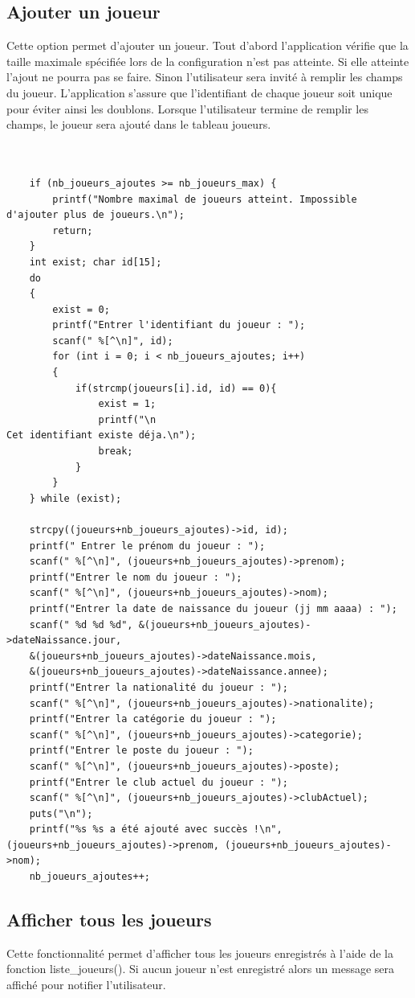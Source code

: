 \documentclass[12pt,a4paper]{report}
\begin{document}
\subsection{Ajouter un joueur}
Cette option permet d'ajouter un joueur. 
Tout d'abord l'application vérifie que la taille maximale spécifiée lors de la configuration n'est pas atteinte. Si elle atteinte l'ajout ne pourra pas se faire. Sinon l'utilisateur sera invité à remplir les champs du joueur. L'application s'assure que l'identifiant de chaque joueur soit unique pour éviter ainsi les doublons.
Lorsque l'utilisateur termine de remplir les champs, le joueur sera ajouté dans le tableau joueurs.
\begin{lstlisting}
	
	
	if (nb_joueurs_ajoutes >= nb_joueurs_max) {
		printf("Nombre maximal de joueurs atteint. Impossible d'ajouter plus de joueurs.\n");
		return;
	}
	int exist; char id[15];    
	do
	{   
		exist = 0;
		printf("Entrer l'identifiant du joueur : ");
		scanf(" %[^\n]", id);
		for (int i = 0; i < nb_joueurs_ajoutes; i++)
		{
			if(strcmp(joueurs[i].id, id) == 0){
				exist = 1;
				printf("\n                                            Cet identifiant existe déja.\n");
				break;
			}
		}               
	} while (exist);
	
	strcpy((joueurs+nb_joueurs_ajoutes)->id, id);    
	printf(" Entrer le prénom du joueur : ");
	scanf(" %[^\n]", (joueurs+nb_joueurs_ajoutes)->prenom); 
	printf("Entrer le nom du joueur : ");
	scanf(" %[^\n]", (joueurs+nb_joueurs_ajoutes)->nom); 
	printf("Entrer la date de naissance du joueur (jj mm aaaa) : ");
	scanf(" %d %d %d", &(joueurs+nb_joueurs_ajoutes)->dateNaissance.jour, 
	&(joueurs+nb_joueurs_ajoutes)->dateNaissance.mois, 
	&(joueurs+nb_joueurs_ajoutes)->dateNaissance.annee); 
	printf("Entrer la nationalité du joueur : ");
	scanf(" %[^\n]", (joueurs+nb_joueurs_ajoutes)->nationalite); 
	printf("Entrer la catégorie du joueur : ");
	scanf(" %[^\n]", (joueurs+nb_joueurs_ajoutes)->categorie); 
	printf("Entrer le poste du joueur : ");
	scanf(" %[^\n]", (joueurs+nb_joueurs_ajoutes)->poste);
	printf("Entrer le club actuel du joueur : ");
	scanf(" %[^\n]", (joueurs+nb_joueurs_ajoutes)->clubActuel);  
	puts("\n");  
	printf("%s %s a été ajouté avec succès !\n", (joueurs+nb_joueurs_ajoutes)->prenom, (joueurs+nb_joueurs_ajoutes)->nom);
	nb_joueurs_ajoutes++; 
\end{lstlisting}

\subsection{Afficher tous les joueurs}
Cette fonctionnalité permet d'afficher tous les joueurs enregistrés à l'aide de la fonction liste\_joueurs().
Si aucun joueur n'est enregistré alors un message sera affiché pour notifier l'utilisateur. 
\end{document}
